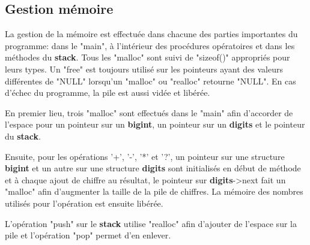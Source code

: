 \documentclass[]{report}
\begin{document}
\newpage
	\begin{normalsize}
		\section*{\LARGE Gestion mémoire}\vspace{4mm}
		La gestion de la mémoire est effectuée dans chacune des parties importantes du programme: dans le "main", à l'intérieur des procédures opératoires et dans les méthodes du \textbf{stack}. Tous les "malloc" sont suivi de "sizeof()" appropriés pour leurs types. Un "free" est toujours utilisé sur les pointeurs ayant des valeurs différentes de "NULL" lorsqu'un "malloc" ou "realloc" retourne "NULL". En cas d'échec du programme, la pile est aussi vidée et libérée.
		\vspace{4mm}
		\par En premier lieu, trois "malloc" sont effectués dans le "main" afin d'accorder de l'espace pour un pointeur sur un \textbf{bigint}, un pointeur sur un \textbf{digits} et le pointeur du \textbf{stack}.
		\vspace{4mm}
		\par Ensuite, pour les opérations '+', '-', '*' et '?', un pointeur sur une structure \textbf{bigint} et un autre sur une structure \textbf{digits} sont initialisés en début de méthode et à chaque ajout de chiffre au résultat, le pointeur sur \textbf{digits}-\textgreater next fait un "malloc" afin d'augmenter la taille de la pile de chiffres. La mémoire des nombres utilisés pour l'opération est ensuite libérée.\vspace{4mm}
		\par L'opération "push" sur le \textbf{stack} utilise "realloc" afin d'ajouter de l'espace sur la pile et l'opération "pop" permet d'en enlever.
		\vspace{4mm}
	\end{normalsize}
\end{document}
